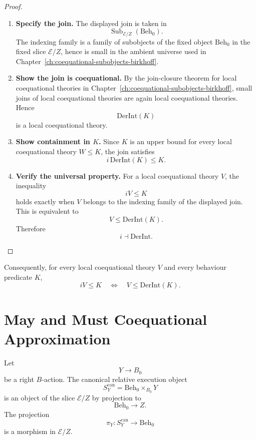 \begin{proof}
\leavevmode
\begin{enumerate}
  \item \textbf{Specify the join.}
  The displayed join is taken in
  \[
    \operatorname{Sub}_{\mathcal E/Z}(\mathrm{Beh}_0).
  \]
  The indexing family is a family of subobjects of the fixed object
  \(\mathrm{Beh}_0\) in the fixed slice \(\mathcal E/Z\), hence is small in
  the ambient universe used in
  Chapter~\ref{ch:coequational-subobjects-birkhoff}.

  \item \textbf{Show the join is coequational.}
  By the join-closure theorem for local coequational theories in
  Chapter~\ref{ch:coequational-subobjects-birkhoff}, small joins of local
  coequational theories are again local coequational theories.  Hence
  \[
    \mathrm{DerInt}(K)
  \]
  is a local coequational theory.

  \item \textbf{Show containment in \(K\).}
  Since \(K\) is an upper bound for every local coequational theory
  \(W\leq K\), the join satisfies
  \[
    i\,\mathrm{DerInt}(K)\leq K.
  \]

  \item \textbf{Verify the universal property.}
  For a local coequational theory \(V\), the inequality
  \[
    iV\leq K
  \]
  holds exactly when \(V\) belongs to the indexing family of the displayed
  join.  This is equivalent to
  \[
    V\leq \mathrm{DerInt}(K).
  \]
  Therefore
  \[
    i\dashv \mathrm{DerInt}.
  \]
\end{enumerate}
\end{proof}

Consequently, for every local coequational theory \(V\) and every behaviour
predicate \(K\),
\[
  iV\leq K
  \quad\Longleftrightarrow\quad
  V\leq \mathrm{DerInt}(K).
\]

\section{May and Must Coequational Approximation}
\label{sec:may-must-coequational-approximation}

Let
\[
  Y\to B_0
\]
be a right \(B\)-action.  The canonical relative execution object
\[
  S^{\mathrm{can}}_Y
  =
  \mathrm{Beh}_0\times_{B_0}Y
\]
is an object of the slice \(\mathcal E/Z\) by projection to
\[
  \mathrm{Beh}_0\to Z.
\]
The projection
\[
  \pi_Y:S^{\mathrm{can}}_Y\to \mathrm{Beh}_0
\]
is a morphism in \(\mathcal E/Z\).

